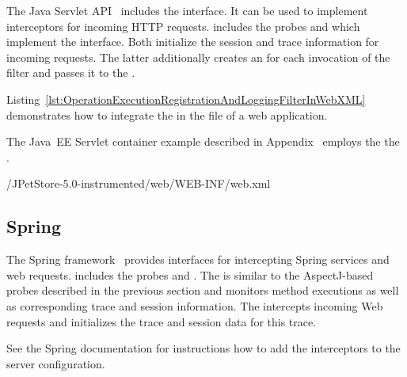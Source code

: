 The Java Servlet API~\cite{JavaServletTechnology-WebSite} includes the %
 interface. It can be used to implement %
interceptors for incoming HTTP requests. %
\Kieker{} includes the probes %
 and %
 which implement the %
 interface. %
Both initialize the session and trace information for incoming requests. %
The latter additionally creates an  for each %
invocation of the filter and passes it to the .


Listing~\ref{lst:OperationExecutionRegistrationAndLoggingFilterInWebXML} %
demonstrates how to integrate the  %
in the  file of a web application. 

The Java~EE Servlet container example described in Appendix~\label{appendix:JavaEEServletExample} employs the %
the .

\pagebreak

\setXMLListing
%
{\JavaEEServletExampleDir/JPetStore-5.0-instrumented/web/WEB-INF/web.xml}


\subsection{Spring}\label{sec:traceAnalysis:instr:spring}

The Spring framework~\cite{Spring-WebSite} provides interfaces for intercepting %
Spring services and web requests. %
\Kieker{} includes the probes %
 and
. %
The  is similar to the %
AspectJ-based probes described in the previous section and monitors method %
executions as well as corresponding trace and session information. %
The  intercepts %
incoming Web requests and initializes the trace and session data for this %
trace.

See the Spring documentation for instructions how to add the interceptors %
to the server configuration.

